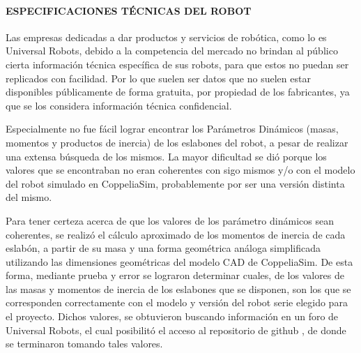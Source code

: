 \documentclass{article}
\begin{document}
\begin{sloppypar}
\paragraph{ESPECIFICACIONES TÉCNICAS DEL ROBOT}
\label{sec:ESPECIFICACIONES TÉCNICAS DEL ROBOT}
\hfill

Las empresas dedicadas a dar productos y servicios de robótica, como lo es Universal Robots, debido a la competencia del mercado no brindan al público cierta información técnica específica de sus robots, para que estos no puedan ser replicados con facilidad. Por lo que suelen ser datos que no suelen estar disponibles públicamente de forma gratuita, por propiedad de los fabricantes, ya que se los considera información técnica confidencial.

Especialmente no fue fácil lograr encontrar los Parámetros Dinámicos (masas, momentos y productos de inercia) de los eslabones del robot, a pesar de realizar una extensa búsqueda de los mismos. La mayor dificultad se dió porque los valores que se encontraban no eran coherentes con sigo mismos y/o con el modelo del robot simulado en CoppeliaSim, probablemente por ser una versión distinta del mismo.

Para tener certeza acerca de que los valores de los parámetro dinámicos sean coherentes, se realizó el cálculo aproximado de los momentos de inercia de cada eslabón, a partir de su masa y una forma geométrica análoga simplificada utilizando las dimensiones geométricas del modelo CAD de CoppeliaSim. De esta forma, mediante prueba y error se lograron determinar cuales, de los valores de las masas y momentos de inercia de los eslabones que se disponen, son los que se corresponden correctamente con el modelo y versión del robot serie elegido para el proyecto. Dichos valores, se obtuvieron buscando información en un foro de Universal Robots, el cual posibilitó el acceso al repositorio de github \cite{Masas_y_Momentos_de_Inercia_de_github_de_Foro_UR}, de donde se terminaron tomando tales valores.


\end{sloppypar}
\end{document}
